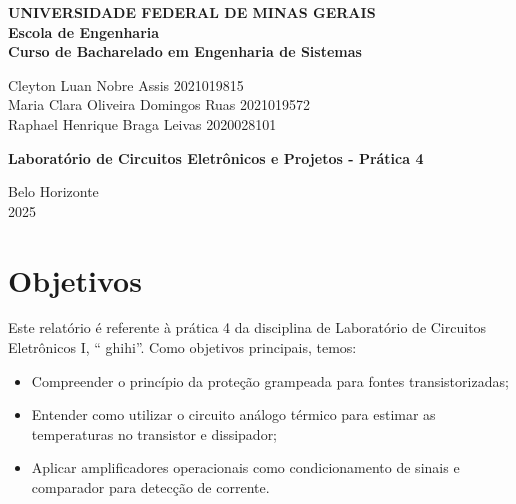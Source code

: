 \documentclass[
	12pt,				%
	oneside,			%
	a4paper,			%
	chapter=TITLE,
	sumario=tradicional,
	english,			%
	brazil				%
]{abntex2}
\begin{document}

\frenchspacing 

\begin{center}
\textbf{UNIVERSIDADE FEDERAL DE MINAS GERAIS\\
Escola de Engenharia \\
Curso de Bacharelado em Engenharia de Sistemas}

\vspace{4cm}

Cleyton Luan Nobre Assis 2021019815 \\
Maria Clara Oliveira Domingos Ruas 2021019572 \\
Raphael Henrique Braga Leivas 2020028101

\vspace{4cm}  

{ \textbf{Laboratório de Circuitos Eletrônicos e Projetos - Prática 4} }

\vfill
{Belo Horizonte \\
2025 }
\end{center}

\newpage

\tableofcontents*
\cleardoublepage

\textual

\pagestyle{simple}
	
\chapter{Objetivos}\label{cap:objetivos} 

Este relatório é referente à prática 4 da disciplina de Laboratório de Circuitos Eletrônicos I, `` ghihi''.  Como objetivos principais, temos:

\begin{itemize}
    \item Compreender o princípio da proteção grampeada para fontes transistorizadas;
    \item Entender como utilizar o circuito análogo térmico para estimar as temperaturas no transistor e dissipador;
    \item Aplicar amplificadores operacionais como condicionamento de sinais e comparador para detecção de corrente.
    
\end{itemize}
\end{document}
